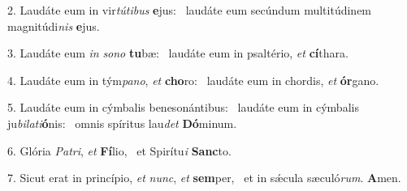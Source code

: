 2. Laudáte eum in vir\textit{tú}\textit{ti}\textit{bus} \textbf{e}jus: \ast\  laudáte eum secúndum multitúdinem magnitúdi\textit{nis} \textbf{e}jus.\

3. Laudáte eum \textit{in} \textit{so}\textit{no} \textbf{tu}bæ: \ast\  laudáte eum in psaltério, \textit{et} \textbf{cí}thara.\

4. Laudáte eum in tým\textit{pa}\textit{no}, \textit{et} \textbf{cho}ro: \ast\  laudáte eum in chordis, \textit{et} \textbf{ór}gano.\

5. Laudáte eum in cýmbalis benesonántibus: \dag\  laudáte eum in cýmbalis ju\textit{bi}\textit{la}\textit{ti}\textbf{ó}nis: \ast\  omnis spíritus lau\textit{det} \textbf{Dó}minum.\

6. Glória \textit{Pa}\textit{tri}, \textit{et} \textbf{Fí}lio, \ast\  et Spirítu\textit{i} \textbf{Sanc}to.\

7. Sicut erat in princípio, \textit{et} \textit{nunc}, \textit{et} \textbf{sem}per, \ast\  et in sǽcula sæculó\textit{rum}. \textbf{A}men.\

